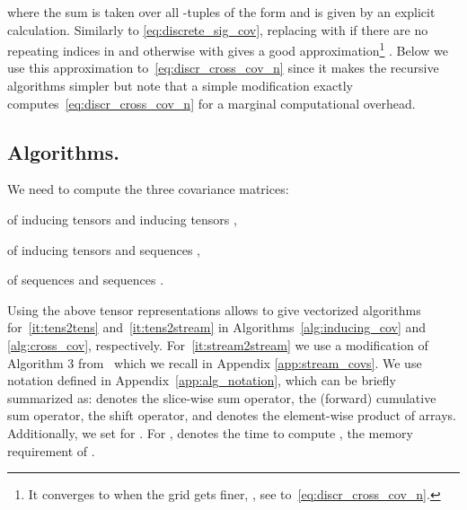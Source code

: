 \documentclass{article}
\begin{document}
  where the sum is taken over all -tuples  of the form  and  is given by an explicit calculation.
  Similarly to \eqref{eq:discrete_sig_cov}, replacing  with  if there are no repeating indices in  and otherwise with  gives a good approximation\footnote{It converges to  when the grid gets finer, , see \cite{ChevyrevOberhauser18} to~\eqref{eq:discr_cross_cov_n}.} .
Below we use this approximation to~\eqref{eq:discr_cross_cov_n} since it makes the recursive algorithms simpler but note that a simple modification exactly computes~\eqref{eq:discr_cross_cov_n} for a marginal computational overhead.\subsection{Algorithms.}
	We need to compute the three covariance matrices:~\begin{enumerate*}[label=(\arabic*)] \item  of inducing tensors  and inducing tensors , \label{it:tens2tens} \item  of inducing tensors  and sequences , \label{it:tens2stream} \item  of sequences  and sequences .\label{it:stream2stream} \end{enumerate*}
	Using the above tensor representations allows to give vectorized algorithms for~\ref{it:tens2tens} and~\ref{it:tens2stream} in Algorithms~\ref{alg:inducing_cov} and \ref{alg:cross_cov}, respectively.
	For~\ref{it:stream2stream} we use a modification of Algorithm 3 from~\cite{KiralyOberhauser2019KSig} which we recall in Appendix \ref{app:stream_covs}.
	We use notation defined in Appendix~\ref{app:alg_notation}, which can be briefly summarized as:  denotes the slice-wise sum operator,  the (forward) cumulative sum operator,  the shift operator, and  denotes the element-wise product of arrays.
  Additionally, we set  for .
  For ,  denotes the time to compute ,  the memory requirement of . 
	
\end{document}
